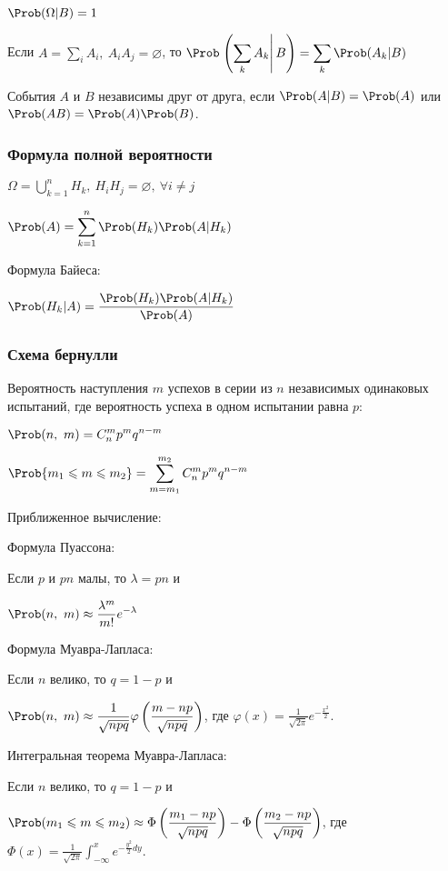 $\displaystyle \Prob(\Omega|B) = 1 $

Если $\displaystyle A = \sum_{i} A_i,\ A_i A_j = \varnothing $, то $\displaystyle \Prob\left.\left(\sum_k A_k\right|B\right) = \sum_k \Prob(A_k|B) $

События $A$ и $B$ независимы друг от друга, если $\Prob(A|B) = \Prob(A)$ или $\Prob(AB) = \Prob(A)\Prob(B)$.

\subsubsection{Формула полной вероятности}

$\displaystyle \Omega = \bigcup_{k=1}^n H_k,\ H_i H_j = \varnothing,\ \forall i \neq j $

$\displaystyle \Prob(A) = \sum_{k=1}^{n} \Prob(H_k) \Prob(A|H_k) $

Формула Байеса:

$\displaystyle \Prob(H_k|A) = \frac{\Prob(H_k)\Prob(A|H_k)}{\Prob(A)} $

\subsubsection{Схема бернулли}

Вероятность наступления $m$ успехов в серии из $n$ независимых одинаковых испытаний, где вероятность успеха в одном испытании равна $p$:

$\displaystyle \Prob(n,\ m) = C_n^m p^m q^{n-m} $

$\displaystyle \Prob\{m_1 \leqslant m \leqslant m_2\} = \sum_{m=m_1}^{m_2} C_n^m p^m q^{n-m} $

Приближенное вычисление:

Формула Пуассона:

Если $p$ и $pn$ малы, то $\lambda = pn$ и 

$\displaystyle \Prob(n,\ m) \approx \frac{\lambda^m}{m!}e^{-\lambda} $ 

Формула Муавра-Лапласа:

Если $n$ велико, то $q = 1 - p$ и

$\displaystyle \Prob(n,\ m) \approx \frac{1}{\sqrt{npq}}\varphi\left(\frac{m-np}{\sqrt{npq}}\right) $, где $\varphi(x) = \frac{1}{\sqrt{2\pi}} e^{-\frac{x^2}{2}}$.

Интегральная теорема Муавра-Лапласа:

Если $n$ велико, то $q = 1 - p$ и

$\displaystyle \Prob(m_1 \leqslant m \leqslant m_2) \approx \Phi\left(\frac{m_1 - np}{\sqrt{npq}}\right) - \Phi\left(\frac{m_2 - np}{\sqrt{npq}}\right) $, где $\Phi(x) = \frac{1}{\sqrt{2\pi}} \int_{-\infty}^{x} e^{-\frac{y^2}{2} dy} $.


